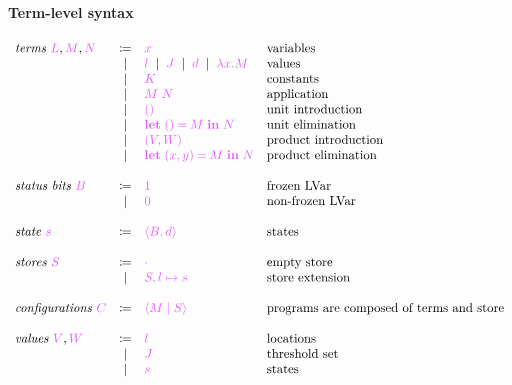 \documentclass[main.tex]{subfiles}
\begin{document}
\paragraph{Term-level syntax}
\[
\begin{array}{lcll}
  \textit{terms }\tm{L}, \tm{M}, \tm{N}
  & \coloneqq & \tm{x}                        & \text{variables} \\
  & \sep      & \tm{l} \sep \tm{J} \sep \tm{d} \sep \tm{\lambda x.M}
                                              & \text{values} \\
  & \sep      & \tm{K}                        & \text{constants} \\
  & \sep      & \tm{M\;N}                     & \text{application} \\
  & \sep      & \tm{\unit}                    & \text{unit introduction} \\
  & \sep      & \tm{\letunit{M}{N}}           & \text{unit elimination} \\
  & \sep      & \tm{\pair{V}{W}}              & \text{product introduction} \\
  & \sep      & \tm{\letpair{x}{y}{M}{N}}     & \text{product elimination}\\
  \\
  \textit{status bits }\tm{B}
  & \coloneqq & \tm{1}                        & \text{frozen LVar} \\
  & \sep      & \tm{0}                        & \text{non-frozen LVar} \\
  \\
  \textit{state } \tm{s}
  & \coloneqq & \tm{\langle B, d \rangle}     & \text{states} \\
  \\
  \textit{stores } \tm{S}
  & \coloneqq & \tm{\emptyenv}                & \text{empty store} \\
  & \sep      & \tm{S, l \mapsto s}           & \text{store extension} \\
  \\
  \textit{configurations }\tm{C}
  & \coloneqq & \tm{\config{M}{S}}            & \text{programs are composed of
                                                    terms and store} \\
  \\
  \textit{values }\tm{V}, \tm{W}
  & \coloneqq & \tm{l}                        & \text{locations} \\
  & \sep      & \tm{J}                        & \text{threshold set} \\
  & \sep      & \tm{s}                        & \text{states} \\

\end{array}\]
\end{document}

